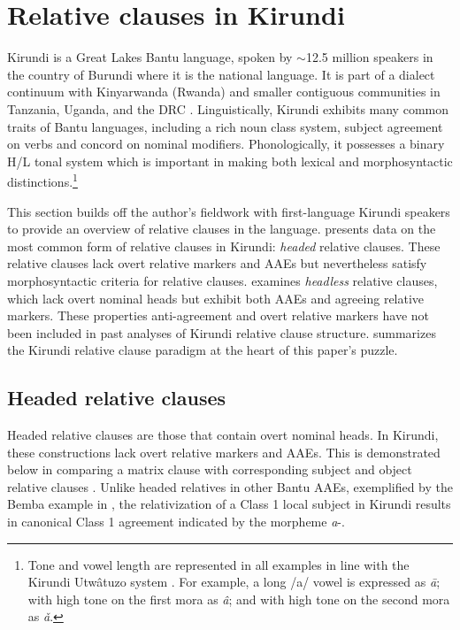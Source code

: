 \documentclass[output=paper,colorlinks,citecolor=brown
]{langscibook}
\begin{document}
\section{Relative clauses in Kirundi} \label{sec:myers:relative}

Kirundi is a Great Lakes Bantu language, spoken by $\sim$12.5 million speakers in the country of Burundi where it is the national language. It is part of a dialect continuum with Kinyarwanda (Rwanda) and smaller contiguous communities in Tanzania, Uganda, and the DRC \citep{Bastin:2003}. Linguistically, Kirundi exhibits many common traits of Bantu languages, including a rich noun class system, subject agreement on verbs and concord on nominal modifiers. Phonologically, it possesses a binary H/L tonal system which is important in making both lexical and morphosyntactic distinctions.\footnote{Tone and vowel length are represented in all examples in line with the Kirundi Utwâtuzo system \citep{utwatuzo:2024}. For example, a long /a/ vowel is expressed as \emph{ā}; with high tone on the first mora as \emph{â}; and with high tone on the second mora as \emph{ǎ}.}

This section builds off the author's fieldwork with first-language Kirundi speakers to provide an overview of relative clauses in the language.  presents data on the most common form of relative clauses in Kirundi: \emph{headed} relative clauses. These relative clauses lack overt relative markers and AAEs but nevertheless satisfy morphosyntactic criteria for relative clauses.  examines \emph{headless} relative clauses, which lack overt nominal heads but exhibit both AAEs and agreeing relative markers. These properties \textendash{} anti-agreement and overt relative markers \textendash{} have not been included in past analyses of Kirundi relative clause structure.  summarizes the Kirundi relative clause paradigm at the heart of this paper's puzzle.


\subsection{Headed relative clauses} \label{sec:myers:headed}

Headed relative clauses are those that contain overt nominal heads. In Kirundi, these constructions lack overt relative markers and AAEs. This is demonstrated below in comparing a matrix clause  with corresponding subject and object relative clauses . Unlike headed relatives in other Bantu AAEs, exemplified by the Bemba example in , the relativization of a Class 1 local subject in Kirundi results in canonical Class 1 agreement indicated by the morpheme \emph{a}-.
\end{document}
